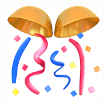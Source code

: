 \documentclass{article}
\begin{document}
\begin{center}
\begin{figure}[h]
\begin{minipage}[h]{0.1\linewidth}
            \end{minipage}
            \begin{minipage}[h]{0.1\linewidth}
            \end{minipage}
            \begin{minipage}[h]{0.4\linewidth}
                \includegraphics[width=0.25\linewidth]{img2}
            \end{minipage}\label{fig:figure}
        \end{figure}
    \end{center}

\end{document}
